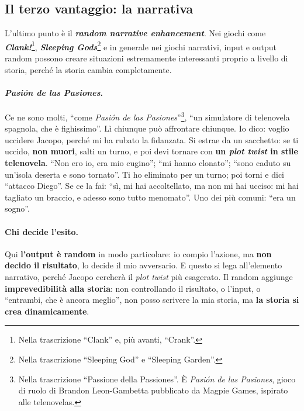 \subsection{Il terzo vantaggio: la narrativa}

L'ultimo punto è il \textbf{\emph{random narrative enhancement}}. Nei giochi come
\textbf{\emph{Clank!}}\footnote{Nella trascrizione ``Clank'' e, più avanti, ``Crank''.},
\textbf{\emph{Sleeping Gods}}\footnote{Nella trascrizione ``Sleeping God'' e ``Sleeping
Garden''.} e in generale nei giochi narrativi, input e output random possono creare
situazioni estremamente interessanti proprio a livello di storia, perché la storia cambia
completamente.

\paragraph{\emph{Pasión de las Pasiones}.} Ce ne sono molti, ``come \emph{Pasión de las
Pasiones}''\footnote{Nella trascrizione ``Passione della Passiones''. È \emph{Pasión de las
Pasiones}, gioco di ruolo di Brandon Leon-Gambetta pubblicato da Magpie Games, ispirato alle
telenovelas.}, ``un simulatore di telenovela spagnola, che è fighissimo''. Lì chiunque può
affrontare chiunque. Io dico: voglio uccidere Jacopo, perché mi ha rubato la fidanzata. Si
estrae da un sacchetto: se ti uccido, \textbf{non muori}, salti un turno, e poi devi tornare
con \textbf{un \emph{plot twist} in stile telenovela}. ``Non ero io, era mio cugino''; ``mi
hanno clonato''; ``sono caduto su un'isola deserta e sono tornato''. Ti ho eliminato per un
turno; poi torni e dici ``attacco Diego''. Se ce la fai: ``sì, mi hai accoltellato, ma non mi
hai ucciso: mi hai tagliato un braccio, e adesso sono tutto menomato''. Uno dei più comuni:
``era un sogno''.

\paragraph{Chi decide l'esito.} Qui \textbf{l'output è random} in modo particolare: io compio
l'azione, ma \textbf{non decido il risultato}, lo decide il mio avversario. E questo si lega
all'elemento narrativo, perché Jacopo cercherà il \emph{plot twist} più esagerato. Il random
aggiunge \textbf{imprevedibilità alla storia}: non controllando il risultato, o l'input, o
``entrambi, che è ancora meglio'', non posso scrivere la mia storia, ma \textbf{la storia si
crea dinamicamente}.

